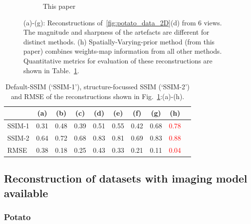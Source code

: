 \documentclass[journal]{IEEEtran}
\begin{document}
\begin{figure}[!h]
\begin{subfigure}[b]{0.24\linewidth}
        \caption{This paper}
     \end{subfigure}
      \caption{(a)-(g): Reconstructions of~\ref{fig:potato_data_2D}(d)
        from $6$ views. The magnitude and sharpness of the artefacts
        are different for distinct methods. (h)
        Spatially-Varying-prior method (from this paper) combines
        weights-map information from all other methods. Quantitative
        metrics for evaluation  of
        these reconstructions are shown in
        Table.~\ref{table:potato_2D_ssim}.}
\label{fig:reconstructions_diff_methods}
\end{figure}
\begin{table}[!h]
  \centering
\caption{Default-SSIM (`SSIM-1'), structure-focussed SSIM (`SSIM-2') and RMSE of the reconstructions shown in
  Fig.~\ref{fig:reconstructions_diff_methods}:(a)-(h). %
}
\begin{tabular}{|l|c|c|c|c|c|c|c|c|c|}
\hline
& \textbf{(a)} & \textbf{(b)} & \textbf{(c)} & \textbf{(d)} & \textbf{(e)} & \textbf{(f)} &  \textbf{(g)} &  \textbf{(h)} \\\hline
SSIM-1 & 0.31 & 0.48  & 0.39  & 0.51 & 0.55  & 0.42 & 0.68 &\textcolor{red}{0.78} \\ \hline
SSIM-2 & 0.64 & 0.72  & 0.68 & 0.83 & 0.81 & 0.69 & 0.83 &\textcolor{red}{0.88} \\ \hline
RMSE & 0.38 & 0.18 & 0.25 & 0.43 & 0.33 & 0.21 & 0.11 & \textcolor{red}{0.04}\\ \hline
\end{tabular}
\label{table:potato_2D_ssim}
\end{table}

\subsection{Reconstruction of datasets with imaging model available}
\label{sec:results_with_imaging_model}
\subsubsection{\textbf{Potato}}
\label{Sec:potato_spatially_varying}
\end{document}
